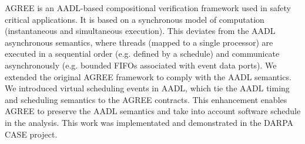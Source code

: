 AGREE is an AADL-based compositional verification framework used in safety critical applications. It is based on a synchronous model of computation (instantaneous and simultaneous execution). This deviates from the AADL asynchronous semantics, where threads (mapped to a single processor) are executed in a sequential order (e.g. defined by a schedule) and communicate asynchronously (e.g. bounded FIFOs associated with event data ports). We extended the original AGREE framework to comply with the AADL semantics. We introduced virtual scheduling events in AADL, which tie the AADL timing and scheduling semantics to the AGREE contracts. This enhancement enables AGREE to preserve the AADL semantics and take into account software schedule in the analysis. This work was implementated and demonstrated in the DARPA CASE project.
